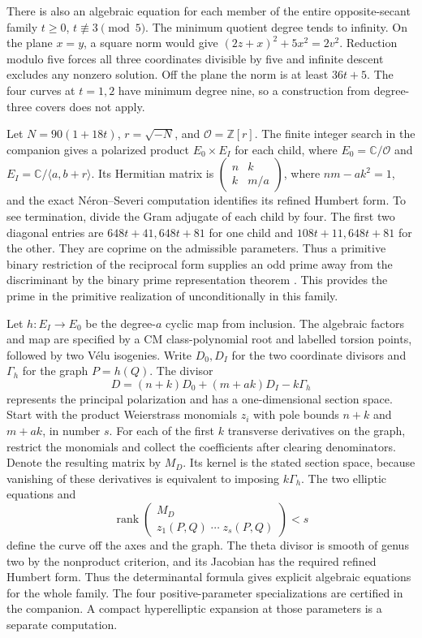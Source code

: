 \documentclass[11pt,letterpaper]{amsart}
\theoremstyle{definition}
\numberwithin{equation}{section}
\newcommand{\Z}{\mathbb Z}
\newcommand{\C}{\mathbb C}
\begin{document}
\smallskip
There is also an algebraic equation for each member of the entire
opposite-secant family \(t\ge0\), \(t\not\equiv3\pmod5\).
The minimum quotient degree tends to infinity. On the plane \(x=y\),
a square norm would give \((2z+x)^2+5x^2=2v^2\). Reduction modulo
five forces all three coordinates divisible by five and infinite
descent excludes any nonzero solution. Off the plane the norm is at
least \(36t+5\). The four curves at \(t=1,2\) have minimum degree
nine, so a construction from degree-three covers does not apply.

Let \(N=90(1+18t)\), \(r=\sqrt{-N}\), and \(\mathcal O=\Z[r]\).
The finite integer search in the companion gives a polarized product
\(E_0\times E_I\) for each child, where \(E_0=\C/\mathcal O\) and
\(E_I=\C/\langle a,b+r\rangle\). Its Hermitian matrix is
\(\left(\begin{smallmatrix}n&k\\k&m/a\end{smallmatrix}\right)\),
where \(nm-ak^2=1\), and the exact N\'eron--Severi computation
identifies its refined Humbert form. To see termination, divide the
Gram adjugate of each child by four. The first two diagonal entries
are \(648t+41,648t+81\) for one child and \(108t+11,648t+81\) for
the other. They are coprime on the admissible parameters. Thus a
primitive binary restriction of the reciprocal form supplies an
odd prime away from the discriminant by the binary prime representation
theorem \cite{Cox}. This provides the prime in the primitive realization
of \cite{KirConstruction} unconditionally in this family.

Let \(h:E_I\to E_0\) be the degree-\(a\) cyclic map from inclusion.
The algebraic factors and map are specified by a CM class-polynomial
root and labelled torsion points, followed by two V\'elu isogenies.
Write \(D_0,D_I\) for the two coordinate divisors and \(\Gamma_h\)
for the graph \(P=h(Q)\). The divisor
\[
 D=(n+k)D_0+(m+ak)D_I-k\Gamma_h
\]
represents the principal polarization and has a one-dimensional
section space. Start with the product Weierstrass monomials \(z_i\)
with pole bounds \(n+k\) and \(m+ak\), in number \(s\).
For each of the first \(k\) transverse derivatives on the graph,
restrict the monomials and collect the coefficients after clearing
denominators. Denote the resulting matrix by \(M_D\). Its kernel is
the stated section space, because vanishing of these derivatives is
equivalent to imposing \(k\Gamma_h\). The two elliptic equations and
\[
 \operatorname{rank}\begin{pmatrix}M_D\\ z_1(P,Q)\;\cdots\;z_s(P,Q)\end{pmatrix}<s
\]
define the curve off the axes and the graph. The theta divisor is
smooth of genus two by the nonproduct criterion, and its Jacobian
has the required refined Humbert form. Thus the determinantal
formula gives explicit algebraic equations for the whole family.
The four positive-parameter specializations are certified in the
companion. A compact hyperelliptic expansion at those parameters
is a separate computation.
\end{document}
